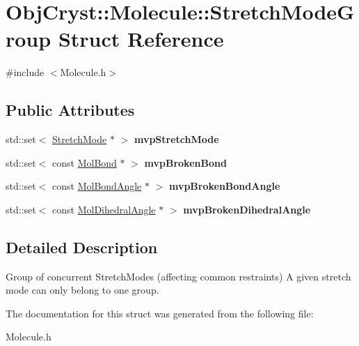 \hypertarget{struct_obj_cryst_1_1_molecule_1_1_stretch_mode_group}{}\section{Obj\+Cryst\+::Molecule\+::Stretch\+Mode\+Group Struct Reference}
\label{struct_obj_cryst_1_1_molecule_1_1_stretch_mode_group}


{\ttfamily \#include $<$Molecule.\+h$>$}

\subsection*{Public Attributes}
\begin{DoxyCompactItemize}
\item 
\mbox{\label{struct_obj_cryst_1_1_molecule_1_1_stretch_mode_group_a63c54cd06ab4a7b838cc686214d41750}} 
std\+::set$<$ \mbox{\hyperlink{struct_obj_cryst_1_1_stretch_mode}{Stretch\+Mode}} $\ast$ $>$ {\bfseries mvp\+Stretch\+Mode}
\item 
\mbox{\label{struct_obj_cryst_1_1_molecule_1_1_stretch_mode_group_a3f6e58dc0887b43c2187080b27e2836f}} 
std\+::set$<$ const \mbox{\hyperlink{class_obj_cryst_1_1_mol_bond}{Mol\+Bond}} $\ast$ $>$ {\bfseries mvp\+Broken\+Bond}
\item 
\mbox{\label{struct_obj_cryst_1_1_molecule_1_1_stretch_mode_group_a2b325fc86d71b14c62efc683e05b0fe0}} 
std\+::set$<$ const \mbox{\hyperlink{class_obj_cryst_1_1_mol_bond_angle}{Mol\+Bond\+Angle}} $\ast$ $>$ {\bfseries mvp\+Broken\+Bond\+Angle}
\item 
\mbox{\label{struct_obj_cryst_1_1_molecule_1_1_stretch_mode_group_aaaee134991cbfe70408dc4b310981c63}} 
std\+::set$<$ const \mbox{\hyperlink{class_obj_cryst_1_1_mol_dihedral_angle}{Mol\+Dihedral\+Angle}} $\ast$ $>$ {\bfseries mvp\+Broken\+Dihedral\+Angle}
\end{DoxyCompactItemize}


\subsection{Detailed Description}
Group of concurrent Stretch\+Modes (affecting common restraints) A given stretch mode can only belong to one group. 

The documentation for this struct was generated from the following file\+:\begin{DoxyCompactItemize}
\item 
Molecule.\+h\end{DoxyCompactItemize}
